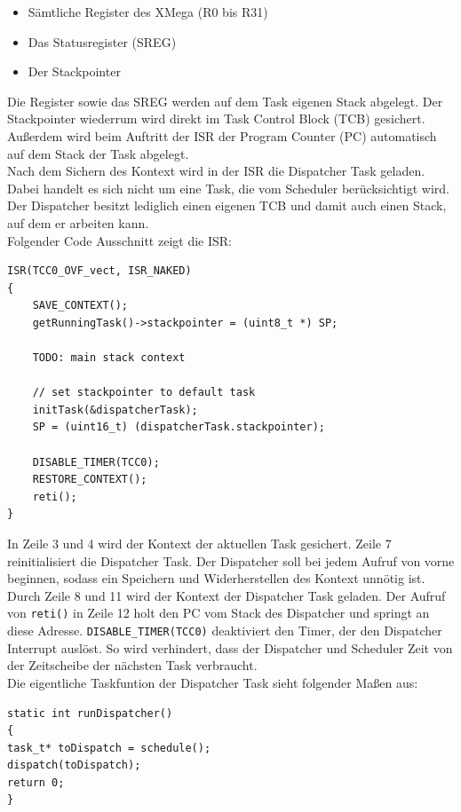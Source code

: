 \documentclass[fontsize=12pt, toc=bibliography, notitlepage]{scrreprt}
\begin{document}
\begin{itemize}
	\item Sämtliche Register des XMega (R0 bis R31)
	\item Das Statusregister (SREG)
	\item Der Stackpointer
\end{itemize}

Die Register sowie das SREG werden auf dem Task eigenen Stack abgelegt. Der Stackpointer wiederrum wird direkt im Task Control Block (TCB) gesichert. Außerdem wird beim Auftritt der ISR der Program Counter (PC) automatisch auf dem Stack der Task abgelegt.\\

Nach dem Sichern des Kontext wird in der ISR die Dispatcher Task geladen. Dabei handelt es sich nicht um eine Task, die vom Scheduler berücksichtigt wird. Der Dispatcher besitzt lediglich einen eigenen TCB und damit auch einen Stack, auf dem er arbeiten kann.\\

Folgender Code Ausschnitt zeigt die ISR:

\begin{lstlisting}[title=dispatcher.c]
ISR(TCC0_OVF_vect, ISR_NAKED)
{
	SAVE_CONTEXT();
	getRunningTask()->stackpointer = (uint8_t *) SP;
	
	TODO: main stack context
	
	// set stackpointer to default task
	initTask(&dispatcherTask);
	SP = (uint16_t) (dispatcherTask.stackpointer);
	
	DISABLE_TIMER(TCC0);
	RESTORE_CONTEXT();
	reti();
}
\end{lstlisting}

In Zeile 3 und 4 wird der Kontext der aktuellen Task gesichert. Zeile 7 reinitialisiert die Dispatcher Task. Der Dispatcher soll bei jedem Aufruf von vorne beginnen, sodass ein Speichern und Widerherstellen des Kontext unnötig ist. Durch Zeile  8 und 11 wird der Kontext der Dispatcher Task geladen. Der Aufruf von \lstinline$reti()$ in Zeile 12 holt den PC vom Stack des Dispatcher und springt an diese Adresse. \lstinline$DISABLE_TIMER(TCC0)$ deaktiviert den Timer, der den Dispatcher Interrupt auslöst. So wird verhindert, dass der Dispatcher und Scheduler Zeit von der Zeitscheibe der nächsten Task verbraucht.\\

Die eigentliche Taskfuntion der Dispatcher Task sieht folgender Maßen aus:

\begin{lstlisting}[title=dispatcher.c]
static int runDispatcher()
{
task_t* toDispatch = schedule();
dispatch(toDispatch);
return 0;
}
\end{lstlisting}
\end{document}
